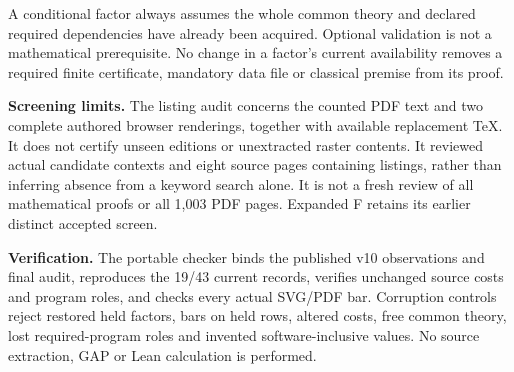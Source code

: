 \documentclass[11pt,a4paper]{article}
\begin{document}
A conditional factor always assumes the whole common theory and declared required dependencies have already been acquired. Optional validation is not a mathematical prerequisite. No change in a factor's current availability removes a required finite certificate, mandatory data file or classical premise from its proof.

\textbf{Screening limits.} The listing audit concerns the counted PDF text and two complete authored browser renderings, together with available replacement TeX. It does not certify unseen editions or unextracted raster contents. It reviewed actual candidate contexts and eight source pages containing listings, rather than inferring absence from a keyword search alone. It is not a fresh review of all mathematical proofs or all 1,003 PDF pages. Expanded F retains its earlier distinct accepted screen.

\textbf{Verification.} The portable checker binds the published v10 observations and final audit, reproduces the 19/43 current records, verifies unchanged source costs and program roles, and checks every actual SVG/PDF bar. Corruption controls reject restored held factors, bars on held rows, altered costs, free common theory, lost required-program roles and invented software-inclusive values. No source extraction, GAP or Lean calculation is performed.
\end{document}
